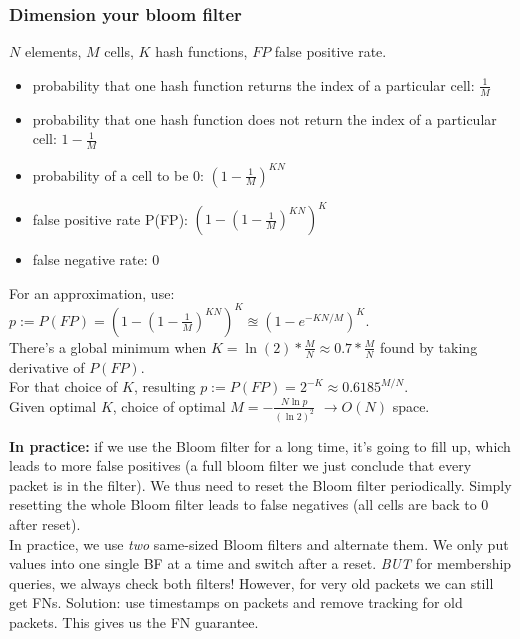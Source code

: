 \documentclass[11pt,oneside,a4paper]{article}
\begin{document}
\subsubsection{Dimension your bloom filter}
\label{bloom_filter_dimension}

$N$ elements, $M$ cells, $K$ hash functions, $FP$ false positive rate.

\vspace{-\topsep}
\begin{itemize}
	\setlength{\itemsep}{0pt}
	\setlength{\parskip}{0pt}
	\item probability that one hash function returns the index of a particular cell: $\frac{1}{M}$
	\item probability that one hash function does not return the index of a particular cell: $1 - \frac{1}{M}$
	\item probability of a cell to be 0: $(1 - \frac{1}{M})^{KN}$
	\item false positive rate P(FP): $(1 - (1 - \frac{1}{M})^{KN})^K$
	\item false negative rate: 0
\end{itemize}
\vspace{-\topsep}

\noindent For an approximation, use: $p := P(FP) = (1 - (1 - \frac{1}{M})^{KN})^K \approxeq (1 - e^{-KN/M})^K$.\\

\noindent There's a global minimum when $K = \ln(2) * \frac{M}{N}  \approx 0.7*\frac{M}{N}$ found by taking derivative of $P(FP)$.\\
For that choice of $K$, resulting $p := P(FP) = 2^{-K} \approx 0.6185^{M/N}$.\\
Given optimal $K$, choice of optimal $M = -\frac{N \ln p}{(\ln2)^2}$ $\rightarrow O(N)$ space.

\newpage

\noindent \textbf{In practice:} if we use the Bloom filter for a long time, it's going to fill up, which leads to more false positives (a full bloom filter we just conclude that every packet is in the filter). We thus need to reset the Bloom filter periodically. Simply resetting the whole Bloom filter leads to false negatives (all cells are back to 0 after reset).\\
In practice, we use \textit{two} same-sized Bloom filters and alternate them. We only put values into one single BF at a time and switch after a reset. \textit{BUT} for membership queries, we always check both filters! However, for very old packets we can still get FNs. Solution: use timestamps on packets and remove tracking for old packets. This gives us the FN guarantee.
\end{document}
